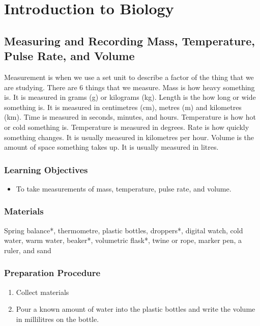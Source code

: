 \section{Introduction to Biology}

\subsection{Measuring and Recording Mass, Temperature, Pulse Rate, and Volume}
Measurement is when we use a set unit to describe a factor of the thing that we are studying. There are 6 things that we measure. Mass is how heavy something is. It is measured in grams (g) or kilograms (kg). Length is the how long or wide something is. It is measured in centimetres (cm), metres (m) and kilometres (km). Time is measured in seconds, minutes, and hours. Temperature is how hot or cold something is. Temperature is measured in degrees. Rate is how quickly something changes. It is usually measured in kilometres per hour. Volume is the amount of space something takes up. It is usually measured in litres.

\subsubsection*{Learning Objectives}
\begin{itemize}
\item{To take measurements of mass, temperature, pulse rate, and volume.}
\end{itemize}

\subsubsection*{Materials}
Spring balance*, thermometre, plastic bottles, droppers*, digital watch, cold water, warm water, beaker*, volumetric flask*, twine or rope, marker pen, a ruler, and sand

\subsubsection*{Preparation Procedure}
\begin{enumerate}
\item{Collect materials}
\item{Pour a known amount of water into the plastic bottles and write the volume in millilitres on the bottle.}
\end{enumerate}


